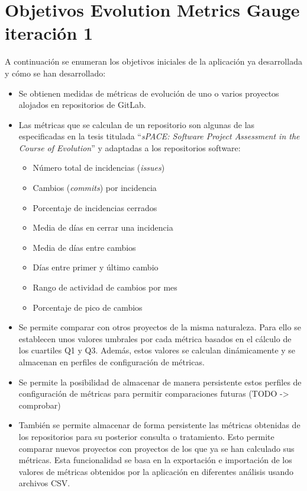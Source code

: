 \section{Objetivos Evolution Metrics Gauge iteración 1}
A continuación se enumeran los objetivos iniciales de la aplicación ya desarrollada y cómo se han desarrollado: \cite{TFGPrevio}
\begin{itemize}
	\tightlist
	\item Se obtienen medidas de métricas de evolución de uno o varios proyectos alojados en repositorios de GitLab.
	\item Las métricas que se calculan de un repositorio  son algunas de las especificadas en la tesis titulada ``\textit{sPACE: Software Project Assessment in the Course of Evolution}'' \cite{ratzinger_space:_2007} y 
	adaptadas a los repositorios software:
	\begin{itemize}
		\tightlist
		\item Número total de incidencias (\textit{issues})
		\item Cambios (\textit{commits}) por incidencia
		\item Porcentaje de incidencias cerrados
		\item Media de días en cerrar una incidencia
		\item Media de días entre cambios
		\item Días entre primer y último cambio
		\item Rango de actividad de cambios por mes
		\item Porcentaje de pico de cambios
	\end{itemize}
	\item Se permite comparar con otros proyectos de la misma naturaleza. Para ello se establecen unos valores umbrales por cada métrica basados en el cálculo de los cuartiles Q1 y Q3. Además, estos valores se calculan dinámicamente y se almacenan en perfiles de configuración de métricas.
	\item Se permite la posibilidad de almacenar de manera persistente estos perfiles de configuración de métricas para permitir comparaciones futuras (TODO -> comprobar)
	\item También se permite almacenar de forma persistente las métricas obtenidas de los repositorios para su posterior consulta o tratamiento. Esto permite comparar nuevos proyectos con proyectos de los que ya se han calculado sus métricas.
	 Esta funcionalidad se basa en la exportación e importación de los valores de métricas obtenidos por la aplicación en diferentes análisis usando archivos CSV.
\end{itemize}


